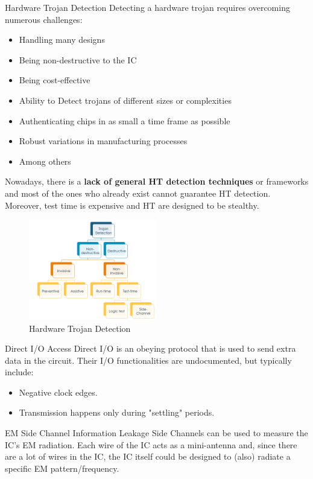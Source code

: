\begin{section}{Hardware Trojan Detection}
Detecting a hardware trojan requires overcoming numerous challenges:
\begin{itemize}
  \item Handling many designs
  \item Being non-destructive to the IC
  \item Being cost-effective
  \item Ability to Detect trojans of different sizes or complexities
  \item Authenticating chips in as small a time frame as possible
  \item Robust variations in manufacturing processes
  \item Among others
\end{itemize}
Nowadays, there is a \textbf{lack of general HT detection techniques} or frameworks and most of the
ones who already exist cannot guarantee HT detection. Moreover, test time is expensive and HT are
designed to be stealthy.

\begin{figure}[H]
  \centering
  \includegraphics[width=0.5\textwidth]{img/hardware/hw trojan detection.png}
  \caption{Hardware Trojan Detection}
  \label{fig:hw-trojan-detection}
\end{figure}

\begin{subsection}{Direct I/O Access}
    Direct I/O is an obeying protocol that is used to send extra data in the circuit. Their I/O
    functionalities are undocumented, but typically include:
    \begin{itemize}
      \item Negative clock edges.
      \item Transmission happens only during "settling" periods.
    \end{itemize}
\end{subsection}

\begin{subsection}{EM Side Channel Information Leakage}
  Side Channels can be used to measure the IC’s EM radiation. Each wire of the IC acts as a
  mini-antenna and, since there are a lot of wires in the IC, the IC itself could be designed to
  (also) radiate a specific EM pattern/frequency.
\end{subsection}

\end{section}

